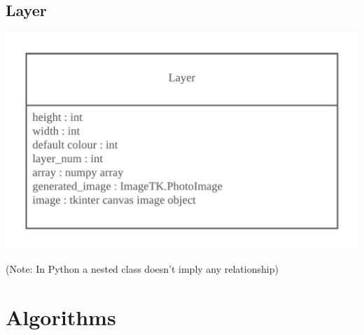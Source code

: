 \documentclass{article}
\begin{document}
\subsection{Layer}
\begin{center}
	\includegraphics[scale=1]{Layer Class}

	\color{mygrey}(Note: In Python a nested class doesn't imply any relationship)
\end{center}

\clearpage

\section{Algorithms}
\end{document}
